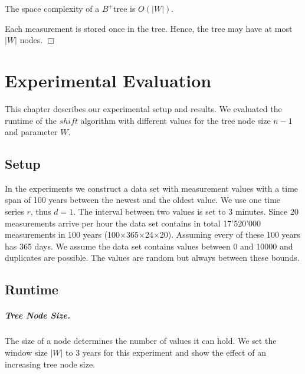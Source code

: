 \documentclass[abstracton,12pt,oneside]{scrreprt}
\newenvironment{proof}
  {\noindent{\bf Proof:\rm}}{\hfill$\Box$\vspace{\medskipamount}}
\begin{document}
\begin{mydef}
	The space complexity of a $B^+$tree is $O(|W|)$. 
\end{mydef}
\begin{proof}
	Each measurement is stored once in the tree. Hence, the tree may have at most $|W|$ nodes.  
\end{proof}



\chapter{Experimental Evaluation}
\label{sec:Experimental}
This chapter describes our experimental setup and results. We evaluated the runtime of the $shift$ algorithm with different values for the tree node size $n-1$ and parameter $W$. 


\section{Setup}
In the experiments we construct a data set with measurement values with a time span of 100 years between the newest and the oldest value. We use one time series $r$, thus $d=1$. The interval between two values is set to $3$ minutes. Since 20 measurements arrive per hour the data set contains in total 17'520'000 measurements in 100 years (100$\times$365$\times$24$\times$20). Assuming every of these 100 years has 365 days. We assume the data set contains values between 0 and 10000 and duplicates are possible. The values are random but always between these bounds. 

\section{Runtime}


\paragraph{Tree Node Size.}
The size of a node determines the number of values it can hold. We set the window size $|W|$ to 3 years for this experiment and show the effect of an increasing tree node size. 
\end{document}
